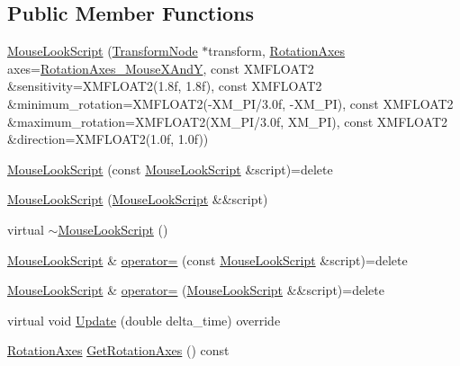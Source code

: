 \subsection*{Public Member Functions}
\begin{DoxyCompactItemize}
\item 
\hyperlink{classmage_1_1_mouse_look_script_a23956bd4bd9541f6ea06b4dd561efb40}{Mouse\+Look\+Script} (\hyperlink{classmage_1_1_transform_node}{Transform\+Node} $\ast$transform, \hyperlink{namespacemage_a548e5c31b08a1078841ed21948f5bf4c}{Rotation\+Axes} axes=\hyperlink{namespacemage_a548e5c31b08a1078841ed21948f5bf4ca6b0dd5cb81f83efb4c2b36456d84750d}{Rotation\+Axes\+\_\+\+Mouse\+X\+AndY}, const X\+M\+F\+L\+O\+A\+T2 \&sensitivity=X\+M\+F\+L\+O\+A\+T2(1.\+8f, 1.\+8f), const X\+M\+F\+L\+O\+A\+T2 \&minimum\+\_\+rotation=\+X\+M\+F\+L\+O\+A\+T2(-\/\+X\+M\+\_\+\+P\+I/3.\+0f, -\/\+X\+M\+\_\+\+P\+I), const X\+M\+F\+L\+O\+A\+T2 \&maximum\+\_\+rotation=\+X\+M\+F\+L\+O\+A\+T2(\+X\+M\+\_\+\+P\+I/3.\+0f, X\+M\+\_\+\+P\+I), const X\+M\+F\+L\+O\+A\+T2 \&direction=\+X\+M\+F\+L\+O\+A\+T2(1.\+0f, 1.\+0f))
\item 
\hyperlink{classmage_1_1_mouse_look_script_a54bd09419068ab61c4dd6fda412771d3}{Mouse\+Look\+Script} (const \hyperlink{classmage_1_1_mouse_look_script}{Mouse\+Look\+Script} \&script)=delete
\item 
\hyperlink{classmage_1_1_mouse_look_script_aaca52076bde601772344c61639345e03}{Mouse\+Look\+Script} (\hyperlink{classmage_1_1_mouse_look_script}{Mouse\+Look\+Script} \&\&script)
\item 
virtual \hyperlink{classmage_1_1_mouse_look_script_ac402a33218e69d3594102b606dd051dc}{$\sim$\+Mouse\+Look\+Script} ()
\item 
\hyperlink{classmage_1_1_mouse_look_script}{Mouse\+Look\+Script} \& \hyperlink{classmage_1_1_mouse_look_script_a13fba7e90bf10d24814e0a8cec25645e}{operator=} (const \hyperlink{classmage_1_1_mouse_look_script}{Mouse\+Look\+Script} \&script)=delete
\item 
\hyperlink{classmage_1_1_mouse_look_script}{Mouse\+Look\+Script} \& \hyperlink{classmage_1_1_mouse_look_script_a2754174f5595fa424471c631818dc2b6}{operator=} (\hyperlink{classmage_1_1_mouse_look_script}{Mouse\+Look\+Script} \&\&script)=delete
\item 
virtual void \hyperlink{classmage_1_1_mouse_look_script_a7962403a78c02b2fe64e8f06f6319312}{Update} (double delta\+\_\+time) override
\item 
\hyperlink{namespacemage_a548e5c31b08a1078841ed21948f5bf4c}{Rotation\+Axes} \hyperlink{classmage_1_1_mouse_look_script_ae7ca5fd8fcfa1fbe6654bae9abc0c5b7}{Get\+Rotation\+Axes} () const

\end{DoxyCompactItemize}
